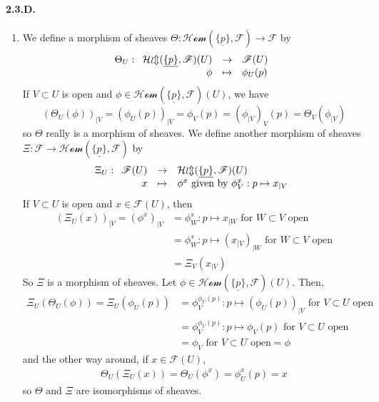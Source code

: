 \documentclass{article}
\newcommand{\applic}[4]{\begin{array}[t]{rcl}
#1 & \to & #2 \\
#3 & \mapsto & #4
\end{array}}
\newcommand{\Fsheaf}{\mathscr{F}}
\newcommand{\sheafHom}{\mathcal{Hom}}
\begin{document}
\paragraph{2.3.D.}
\begin{enumerate}
    \item We define a morphism of sheaves $\Theta : \sheafHom(\underline{\{p\}},\Fsheaf) \to \Fsheaf$ by
    \[\Theta_U : \applic{\sheafHom(\underline{\{p\}},\Fsheaf)(U)}{\Fsheaf(U)}{\phi}{\phi_U(p)}\]
    If $V\subset U$ is open and $\phi \in \sheafHom(\underline{\{p\}},\Fsheaf)(U)$, we have
    \[(\Theta_U (\phi))_{\mid V} = (\phi_U (p))_{\mid V} = \phi_V(p) = (\phi_{\mid V})_V (p) = \Theta_V(\phi_{\mid V})\]
    so $\Theta$ really is a morphism of sheaves. We define another morphism of sheaves $\Xi : \Fsheaf \to \sheafHom(\underline{\{p\}},\Fsheaf)$ by
    \[\Xi_U : \applic{\Fsheaf(U)}{\sheafHom(\underline{\{p\}},\Fsheaf)(U)}{x}{\phi^x \text{ given by } \phi_V^x : p \mapsto x_{\mid V}}\]
    If $V \subset U$ is open and $x \in \Fsheaf(U)$, then
    \begin{align*}
        (\Xi_U (x))_{\mid V} = (\phi^x)_{\mid V} & = \phi_W^s : p \mapsto x_{\mid W} \text{ for $W \subset V$ open} \\
        & = \phi_W^s : p \mapsto (x_{\mid V})_{\mid W} \text{ for $W \subset V$ open} \\
        & = \Xi_V(x_{\mid V})
    \end{align*}
    So $\Xi$ is a morphism of sheaves. Let $\phi \in \sheafHom(\underline{\{p\}},\Fsheaf)(U)$. Then,
    \begin{align*}
        \Xi_U (\Theta_U (\phi)) = \Xi_U (\phi_U(p)) & = \phi^{\phi_U (p)}_V : p \mapsto (\phi_U(p))_{\mid V} \text{ for $V \subset U$ open} \\
        & = \phi^{\phi_U (p)}_V : p \mapsto \phi_V(p) \text{ for $V \subset U$ open} \\
        & = \phi_V \text{ for $V \subset U$ open} = \phi
    \end{align*}
    and the other way around, if $x \in \Fsheaf(U)$,
    \begin{align*}
        \Theta_U (\Xi_U (x)) = \Theta_U(\phi^x) = \phi^x_U (p) = x
    \end{align*}
    so $\Theta$ and $\Xi$ are isomorphisms of sheaves.


\end{enumerate}
\end{document}
